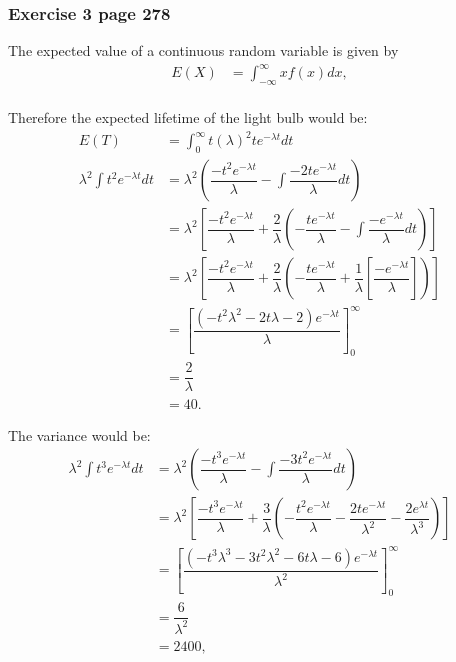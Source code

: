 \documentclass[10pt,leter,openany]{article}
\begin{document}
	\subsubsection*{Exercise 3 page 278}
	
	The expected value of a continuous random variable is given by
	\begin{equation*}
		\begin{aligned}
			E(X) & = \int_{-\infty}^{\infty} x f(x)  dx,\\
		\end{aligned}	
	\end{equation*}
	
	
	Therefore the expected lifetime of the light bulb would be:
	\begin{equation*}
		\begin{aligned}
			E(T) & = \int_{0}^{\infty} t (\lambda)^2 t e^{-\lambda t}  dt\\
\lambda^2 \int t^2 e^{-\lambda t} dt&	= \lambda^{2}\left( \dfrac{-t^{2}e^{-\lambda t}}{\lambda} - \int \dfrac{-2te^{-\lambda t}}{\lambda}dt\right) \\
 & = \lambda^{2}\left[ \dfrac{-t^{2}e^{-\lambda t}}{\lambda} + \dfrac{2}{\lambda}\left( - \dfrac{te^{-\lambda t}}{\lambda} - \int \dfrac{-e^{-\lambda t}}{\lambda}dt\right) \right] \\
 & = \lambda^{2}\left[ \dfrac{-t^{2}e^{-\lambda t}}{\lambda} + \dfrac{2}{\lambda}\left( - \dfrac{te^{-\lambda t}}{\lambda} + \dfrac{1}{\lambda}\left[ \dfrac{-e^{-\lambda t}}{\lambda}\right] \right) \right] \\
 & = \left[ \dfrac{\left( -t^{2} \lambda^{2} - 2t\lambda -2\right) e^{-\lambda t}}{\lambda} \right]^{\infty}_{0}\\
 & = \dfrac{2}{\lambda}\\
 & = 40.
			\end{aligned}	
	\end{equation*}

	The variance would be:
		\begin{equation*}
		\begin{aligned}
	\lambda^2 \int t^3 e^{-\lambda t} dt&	= \lambda^{2}\left( \dfrac{-t^{3}e^{-\lambda t}}{\lambda} - \int \dfrac{-3t^{2}e^{-\lambda t}}{\lambda}dt\right) \\
	& = \lambda^{2}\left[ \dfrac{-t^{3}e^{-\lambda t}}{\lambda} + \dfrac{3}{\lambda}\left( - \dfrac{t^{2}e^{-\lambda t}}{\lambda} - \dfrac{2 t e^{-\lambda t}}{\lambda^{2}} - \dfrac{2e^{\lambda t}}{\lambda^{3}}\right) \right] \\
	& = \left[ \dfrac{\left( -t^{3}\lambda^{3} - 3t^{2}\lambda^{2} - 6t\lambda-6\right) e^{-\lambda t}}{\lambda^{2}} \right] ^{\infty}_{0}\\
	 & = \dfrac{6}{\lambda^{2}}\\
	& = 2400,
				\end{aligned}	
\end{equation*}
\end{document}
